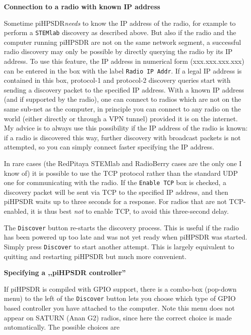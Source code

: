 \documentclass[12pt]{book}
\def\rett#1{\texttt{\color{red}#1}}
\def\pH{pi\-HPSDR\xspace}
\begin{document}
\textbf{Connection to a radio with known IP address}

Sometime \pH \textit{needs} to know the IP address of the radio, for example to perform
a \texttt{STEMlab} discovery as described above. But also if the radio and the computer running
\pH are not on the same network segment, a successful radio discovery may only be possible
by directly querying the radio by its IP address. To use this feature,
the IP address in numerical form (xxx.xxx.xxx.xxx) can be entered in the box
with the label \rett{Radio IP Addr}. If a legal IP address is contained in this box, protocol-1 and
protocol-2 discovery queries start with sending a discovery packet to the specified IP
address. With a known IP address (and if supported by the radio),  one can
connect to radios which are not on the same sub-net as the computer, in principle you can connect to any
radio on the world (either directly or through a VPN tunnel)
provided it is on the internet. My advice is to always use this possibility if the IP address of
the radio is known: if a radio is discovered this way, further discovery with broadcast packets
is not attempted, so you can simply connect faster specifying the IP address.

In rare cases (the RedPitaya STEMlab and RadioBerry cases are the only one I know of)
it is  possible to use the TCP protocol
rather than the standard UDP one for communicating with the radio.
If the \rett{Enable TCP} box is checked, a discovery packet will be sent via TCP to the specified
IP address, and then \pH waits up to three seconds for a response. For radios that are not
TCP-enabled, it is thus best \textit{not} to enable TCP, to avoid this three-second delay.


The \rett{Discover} button re-starts the discovery process. This is useful if the radio has been powered up
too late and
was not yet ready when \pH was started. Simply press \rett{Discover} to start another attempt. This is
largely equivalent to quitting and restarting \pH but much more convenient.

\textbf{Specifying a ,,piHPSDR controller''}

If \pH is compiled with GPIO support, there is a
combo-box (pop-down menu) to the left of the \rett{Discover} button lets you choose which type of GPIO
based controller you
have attached to the computer. Note this menu does not appear on SATURN (Anan G2) radios,
since here the correct choice is made automatically. The possible choices are
\end{document}
